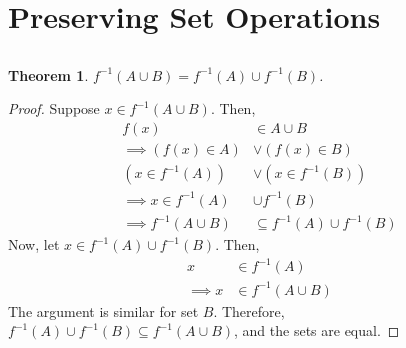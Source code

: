 \documentclass{article}
\newtheorem{theorem}{Theorem}
\begin{document}
\section{Preserving Set Operations}

\subsection{}

\begin{theorem}
    \(f^{-1}(A \cup B) = f^{-1}(A) \cup f^{-1}(B)\).
\end{theorem}
\begin{proof}
    Suppose \(x \in f^{-1}(A \cup B)\).
    Then,
    \begin{align}
        f(x) &\in A \cup B \\
        \implies (f(x) \in A) &\lor (f(x) \in B) \\
        (x \in f^{-1}(A)) &\lor (x \in f^{-1}(B)) \\
        \implies x \in f^{-1}(A) &\cup f^{-1}(B) \\
        \implies f^{-1}(A \cup B) &\subseteq f^{-1}(A) \cup f^{-1}(B)
    \end{align}
    Now, let \(x \in f^{-1}(A) \cup f^{-1}(B)\).
    Then,
    \begin{align}
        x &\in f^{-1}(A) \\
        \implies x &\in f^{-1}(A \cup B) 
    \end{align}
    The argument is similar for set \(B\).
    Therefore, \(f^{-1}(A) \cup f^{-1}(B) \subseteq f^{-1}(A \cup B)\), and the sets are equal.
\end{proof}

\subsection{}
\end{document}
